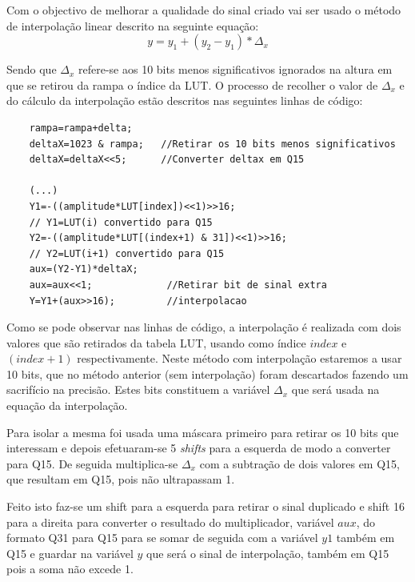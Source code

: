 \documentclass[11pt]{article}
\numberwithin{equation}{section}
\begin{document}
	Com o objectivo de melhorar a qualidade do sinal criado vai ser usado o método de interpolação linear descrito na seguinte equação:
	\begin{equation}
	y=y_{1}+(y_{2}-y_{1})*\Delta_{x}
	\end{equation}                       
	
	Sendo que $ \Delta_{x} $ refere-se aos 10 bits menos significativos ignorados na altura em que se retirou da rampa o índice da LUT. O processo de recolher o valor de $ \Delta_{x} $ e do cálculo da interpolação estão descritos nas seguintes linhas de código:
	
	\begin{lstlisting}
	rampa=rampa+delta;
	deltaX=1023 & rampa;   //Retirar os 10 bits menos significativos
	deltaX=deltaX<<5;      //Converter deltax em Q15
	
	(...)
	Y1=-((amplitude*LUT[index])<<1)>>16;	
	// Y1=LUT(i) convertido para Q15
	Y2=-((amplitude*LUT[(index+1) & 31])<<1)>>16;	
	// Y2=LUT(i+1) convertido para Q15
	aux=(Y2-Y1)*deltaX;		
	aux=aux<<1;				//Retirar bit de sinal extra
	Y=Y1+(aux>>16);			//interpolacao	
	\end{lstlisting}
	
	Como se pode observar nas linhas de código, a interpolação é realizada com dois valores que são retirados da tabela LUT, usando como índice $\textit{index}$ \hspace{0,1 mm} e $(\textit{index}+1)$ respectivamente. Neste método com interpolação estaremos a usar 10 bits, que no método anterior (sem interpolação) foram descartados fazendo um sacrifício na precisão. Estes bits constituem a variável $ \Delta_{x} $ que será usada na equação da interpolação.
	
	Para isolar a mesma foi usada uma máscara primeiro para retirar os 10 bits que interessam e depois efetuaram-se 5 \textit{shifts} para a esquerda de modo a converter para Q15. De seguida multiplica-se $\Delta_x$ com a subtração de dois valores em Q15, que resultam em Q15, pois não ultrapassam 1. 
	
	Feito isto faz-se um shift para a esquerda para retirar o sinal duplicado e shift 16 para a direita para converter o resultado do multiplicador, variável $aux$, do formato Q31 para Q15 para se somar de seguida com a variável $y1$ também em Q15 e guardar na variável $y$ que será o sinal de interpolação, também em Q15 pois a soma não excede 1.
	
\end{document}
